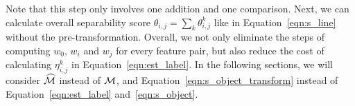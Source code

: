 Note that this step only involves one addition and one comparison.
Next, we can calculate overall separability score $\theta_{i,j} = \sum_{k}{\theta_{i,j}^{k}}$ like in Equation~\ref{eqn:s_line}
without the pre-transformation. Overall,
we not only eliminate the steps of computing
$w_0$, $w_i$ and $w_j$ for every feature pair,
but also reduce the cost of calculating
$\eta_{i,j}^{k}$ in Equation~\ref{eqn:est_label}.
In the following sections,
we will consider $\widehat{{\mathcal{M}}}$ instead of ${\mathcal{M}}$,
and Equation~\ref{eqn:s_object_transform} instead of
Equation~\ref{eqn:est_label} and~\ref{eqn:s_object}.



